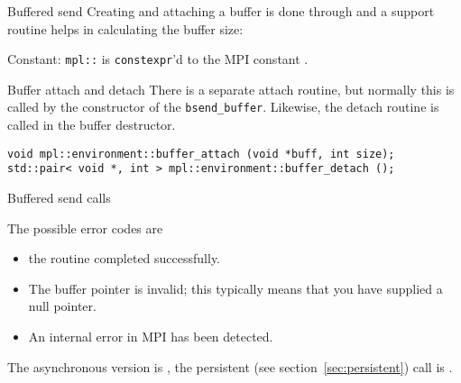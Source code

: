 \begin{mplnote}{Buffered send}
  Creating and attaching a buffer is done through 
  and a support routine  helps in calculating
  the buffer size:

  Constant: \lstinline+mpl::+ is \lstinline{constexpr}'d
  to the MPI constant .
\end{mplnote}

\begin{mplnote}{Buffer attach and detach}
  There is a separate attach routine, but normally this is called
  by the constructor of the \lstinline+bsend_buffer+.
  Likewise, the detach routine is called in the buffer destructor.
\begin{lstlisting}
void mpl::environment::buffer_attach (void *buff, int size);
std::pair< void *, int > mpl::environment::buffer_detach ();
\end{lstlisting}
\end{mplnote}

 {Buffered send calls}

The possible error codes are
\begin{itemize}
\item {} the routine completed successfully.
\item {} The buffer pointer is invalid;
  this typically means that you have supplied a null pointer.
\item {} An internal error in MPI has been detected.
\end{itemize}

The asynchronous version is , the persistent
(see section~\ref{sec:persistent}) call is .

